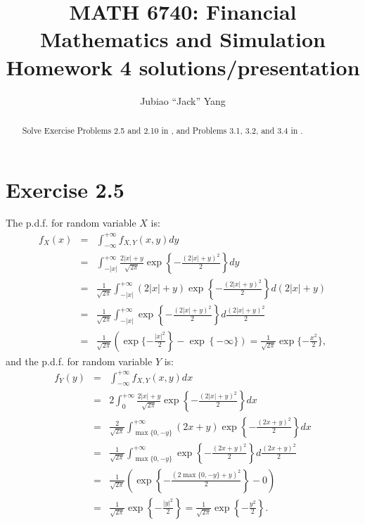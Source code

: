\documentclass[final,3p,authoryear]{elsarticle}
\begin{document}
\begin{frontmatter}

\title{MATH 6740: Financial Mathematics and Simulation\\
	Homework 4 solutions/presentation}

\author[rvt]{Jubiao ``Jack'' Yang}

\address[rvt]{Rensselaer Polytechnic Institute, Troy, NY 12180}

\begin{abstract}
	Solve Exercise Problems 2.5 and 2.10 in \cite[Chapter 2]{shreve2004stochastic}, and Problems 3.1, 3.2, and 3.4 in \cite[Chapter 3]{shreve2004stochastic}.
\end{abstract}


\end{frontmatter}

\section{Exercise 2.5}
	The p.d.f. for random variable $X$ is:
	\begin{eqnarray}
		f_X(x) &=& \int_{-\infty}^{+\infty} f_{X,Y}(x,y) dy \nonumber\\
		&=& \int_{-\left|x\right|}^{+\infty} \frac{2\left|x\right|+y}{\sqrt{2\pi}} \exp\left\{-\frac{\left(2\left|x\right|+y\right)^2}{2}\right\} dy \nonumber\\
		&=& \frac{1}{\sqrt{2\pi}} \int_{-\left|x\right|}^{+\infty} \left(2\left|x\right|+y\right) \exp\left\{-\frac{\left(2\left|x\right|+y\right)^2}{2}\right\} d\left(2\left|x\right|+y\right) \nonumber\\
		&=& \frac{1}{\sqrt{2\pi}} \int_{-\left|x\right|}^{+\infty} \exp\left\{-\frac{\left(2\left|x\right|+y\right)^2}{2}\right\} d\frac{\left(2\left|x\right|+y\right)^2}{2} \nonumber\\
		&=& \frac{1}{\sqrt{2\pi}} \left( \exp\{-\frac{\left|x\right|^2}{2}\right\} - \exp\left\{-\infty\} \right) 
		= \frac{1}{\sqrt{2\pi}} \exp\{-\frac{x^2}{2}\}
		,
	\end{eqnarray}
	and the p.d.f. for random variable $Y$ is:
	\begin{eqnarray}
		f_Y(y) &=& \int_{-\infty}^{+\infty} f_{X,Y}(x,y) dx \nonumber\\
		&=& 2 \int_{0}^{+\infty} \frac{2\left|x\right|+y}{\sqrt{2\pi}} \exp\left\{-\frac{\left(2\left|x\right|+y\right)^2}{2}\right\} dx \nonumber\\
		&=& \frac{2}{\sqrt{2\pi}} \int_{\max\{0,-y\}}^{+\infty} \left(2x+y\right) \exp\left\{-\frac{\left(2x+y\right)^2}{2}\right\} dx \nonumber\\
		&=& \frac{1}{\sqrt{2\pi}} \int_{\max\{0,-y\}}^{+\infty} \exp\left\{-\frac{\left(2x+y\right)^2}{2}\right\} d\frac{\left(2x+y\right)^2}{2} \nonumber\\
		&=& \frac{1}{\sqrt{2\pi}} \left( \exp\left\{-\frac{\left(2\max\{0,-y\}+y\right)^2}{2}\right\} -0 \right) \nonumber\\
		&=& \frac{1}{\sqrt{2\pi}} \exp\left\{-\frac{\left|y\right|^2}{2}\right\}
		= \frac{1}{\sqrt{2\pi}} \exp\left\{-\frac{y^2}{2}\right\}
		.
	\end{eqnarray}
\end{document}
